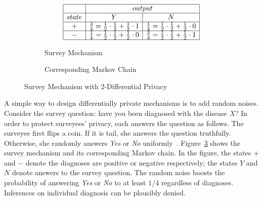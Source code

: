 
\begin{figure}
  \centering
  \begin{subfigure}{.48\columnwidth}
      \[
      \begin{array}{|c|c|c|}
        \hline
        &
        \multicolumn{2}{c|}{output}
        \\
        \hline
        state & Y & N \\
        \hline
        + & \frac{3}{4} = \frac{1}{2} \cdot \frac{1}{2} + \frac{1}{2} \cdot 1 
          & \frac{1}{4} = \frac{1}{2} \cdot \frac{1}{2} + \frac{1}{2} \cdot 0 
        \\
        \hline
        - & \frac{1}{4} = \frac{1}{2} \cdot \frac{1}{2} + \frac{1}{2} \cdot 0 
          & \frac{3}{4} = \frac{1}{2} \cdot \frac{1}{2} + \frac{1}{2} \cdot 1 
        \\
        \hline
      \end{array}
      \]
    \caption{Survey Mechanism}
    \label{figure:2-dp-table}
  \end{subfigure}  
  \hspace{.05\columnwidth}
  \begin{subfigure}{.40\columnwidth}
    \caption{Corresponding Markov Chain}
    \label{figure:2-dp-mdp}
  \end{subfigure}
  \caption{Survey Mechanism with 2-Differential Privacy}
  \label{figure:2-dp}
\end{figure}

A simple way to design differentially private mechanisms is to add 
random noises. Consider the survey question: have you been diagnosed
with the disease $X$? In order to protect surveyees' privacy, each
answers the question as follows. The surveyee first flips a
coin. If it is tail, she answers the question truthfully. Otherwise, 
she randomly answers \textit{Yes} or \textit{No}
uniformly~\cite{DR:14:AFDP}. Figure~\ref{figure:2-dp} shows the survey
mechanism and its corresponding Markov chain. In the figure, the states
$+$ and $-$ denote the diagnoses are positive or negative
respectively; the states $Y$ and $N$ denote answers to the survey
question. The random noise boosts the probability of answering
\textit{Yes} or \textit{No} to at least $1/4$ regardless of
diagnoses. Inferences on individual diagnosis can be plausibly denied. 

